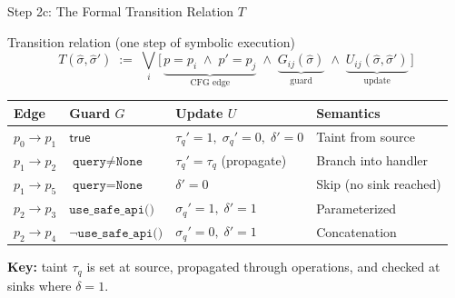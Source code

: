 \documentclass[aspectratio=169]{beamer}
\begin{document}
\begin{frame}{Step 2c: The Formal Transition Relation $T$}
\begin{block}{Transition relation (one step of symbolic execution)}
\vspace{-0.3em}
\[
  T(\hat\sigma, \hat\sigma') \;:=\; \bigvee_{i} \bigl[\,
    \underbrace{p = p_i \;\wedge\; p' = p_j}_{\text{CFG edge}} \;\wedge\;
    \underbrace{G_{ij}(\hat\sigma)}_{\text{guard}} \;\wedge\;
    \underbrace{U_{ij}(\hat\sigma, \hat\sigma')}_{\text{update}}
  \,\bigr]
\]
\end{block}

\vspace{0.2em}
\footnotesize
\renewcommand{\arraystretch}{1.3}
\begin{tabular}{@{}llll@{}}
\toprule
\textbf{Edge} & \textbf{Guard $G$} & \textbf{Update $U$} & \textbf{Semantics} \\
\midrule
$p_0 \to p_1$ & $\mathsf{true}$ & $\tau_q' = 1,\;\sigma_q' = 0,\;\delta' = 0$ & Taint from source \\
$p_1 \to p_2$ & $\texttt{query} \neq \texttt{None}$ & $\tau_q' = \tau_q$ (propagate) & Branch into handler \\
$p_1 \to p_5$ & $\texttt{query} = \texttt{None}$ & $\delta' = 0$ & Skip (no sink reached) \\
$p_2 \to p_3$ & $\texttt{use\_safe\_api()}$ & $\sigma_q' = 1,\;\delta' = 1$ & Parameterized \\
$p_2 \to p_4$ & $\neg\texttt{use\_safe\_api()}$ & $\sigma_q' = 0,\;\delta' = 1$ & Concatenation \\
\bottomrule
\end{tabular}

\vspace{0.5em}
\normalsize
\textbf{Key:} taint $\tau_q$ is set at source, propagated through operations,
and checked at sinks where $\delta = 1$.
\end{frame}


\end{document}
